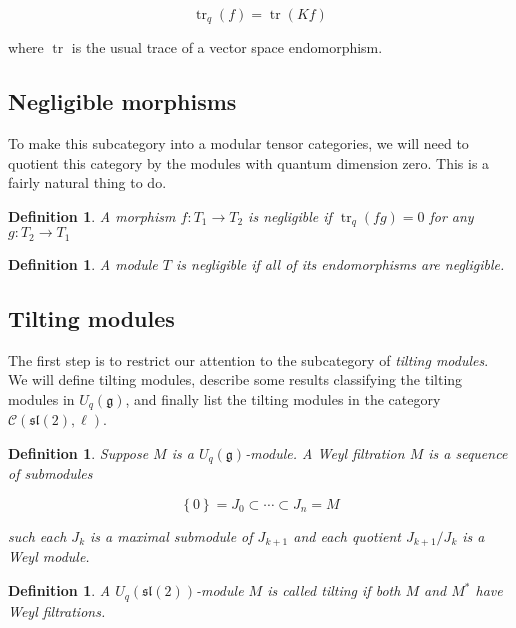 \documentclass[]{article}
\newtheorem{defn}[theorem]{Definition}
\newcommand{\tr}{\operatorname{tr}}
\newcommand{\sll}{\mathfrak{sl}}
\numberwithin{equation}{subsection}
\begin{document}
\begin{equation}
    \tr_q(f) = \tr(Kf)
\end{equation}

where $\tr$ is the usual trace of a vector space endomorphism.

\subsection{Negligible morphisms}
To make this subcategory into a modular tensor categories, we will need to
quotient this category by the modules with quantum dimension zero. This is a
fairly natural thing to do.  %

\begin{defn}
    A morphism $f: T_1 \to T_2$ is \emph{negligible} if $\tr_q(fg) = 0$ for any $g: T_2 \to T_1$
\end{defn}


\begin{defn}
    A module $T$ is \emph{negligible} if all of its endomorphisms are negligible.
\end{defn}
\subsection{Tilting modules} 

The first step is to restrict our attention to the subcategory of \emph{tilting
modules}. We will define tilting modules, describe some results classifying the
tilting modules in $U_q(\mathfrak{g})$, and finally list the tilting modules in
the category $\mathcal{C}(\sll(2), \ell)$.

\begin{defn}
    Suppose $M$ is a $U_q(\mathfrak{g})$-module. A \emph{Weyl filtration} $M$ is a sequence of submodules 

    \begin{equation}
        \left\{ 0 \right\} = J_0 \subset \cdots \subset J_n = M
    \end{equation}

    such each $J_k$ is a maximal submodule of $J_{k+1}$ and each quotient $J_{k+1}/J_k$ is a Weyl module. 
\end{defn}

\begin{defn}
    A $U_q(\sll(2))$-module $M$ is called \emph{tilting} if both $M$ and $M^*$ have Weyl filtrations.
\end{defn}
\end{document}
